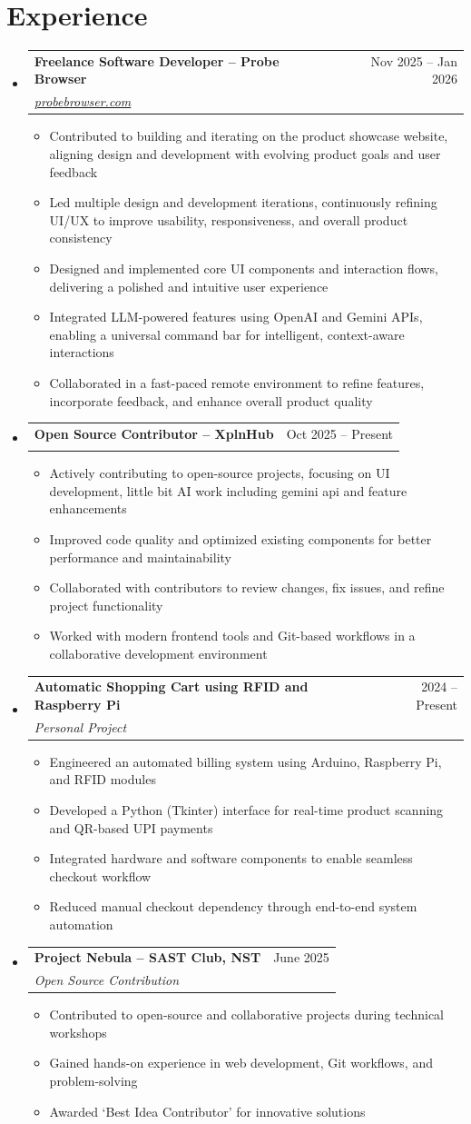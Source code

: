 \documentclass[letterpaper,11pt]{article}
\makeatletter
\newcommand{\resumeItem}[1]{
  \item\small{
    {#1 \vspace{-2pt}}
  }
}
\newcommand{\resumeSubheading}[4]{
  \vspace{-2pt}\item
    \begin{tabular*}{0.97\textwidth}[t]{l@{\extracolsep{\fill}}r}
      \textbf{#1} & #2 \\
      \textit{\small#3} & \textit{\small #4} \\
    \end{tabular*}\vspace{-7pt}
}
\newcommand{\resumeSubHeadingListStart}{\begin{itemize}[leftmargin=0.15in, label={}]}
\newcommand{\resumeSubHeadingListEnd}{\end{itemize}}
\newcommand{\resumeItemListStart}{\begin{itemize}}
\newcommand{\resumeItemListEnd}{\end{itemize}\vspace{-5pt}}
\makeatother
\begin{document}
\section{Experience}
  \resumeSubHeadingListStart
    \resumeSubheading
  {Freelance Software Developer – Probe Browser}{Nov 2025 -- Jan 2026}
  {\href{https://probebrowser.com}{probebrowser.com}}{}
  \resumeItemListStart
    \resumeItem{Contributed to building and iterating on the product showcase website, aligning design and development with evolving product goals and user feedback}
    \resumeItem{Led multiple design and development iterations, continuously refining UI/UX to improve usability, responsiveness, and overall product consistency}
    \resumeItem{Designed and implemented core UI components and interaction flows, delivering a polished and intuitive user experience}
    \resumeItem{Integrated LLM-powered features using OpenAI and Gemini APIs, enabling a universal command bar for intelligent, context-aware interactions}
    \resumeItem{Collaborated in a fast-paced remote environment to refine features, incorporate feedback, and enhance overall product quality}
  \resumeItemListEnd
  \resumeSubheading
  {Open Source Contributor – XplnHub}{Oct 2025 -- Present}
  {}{}
  \resumeItemListStart
    \resumeItem{Actively contributing to open-source projects, focusing on UI development, little bit AI work including gemini api and feature enhancements}
    \resumeItem{Improved code quality and optimized existing components for better performance and maintainability}
    \resumeItem{Collaborated with contributors to review changes, fix issues, and refine project functionality}
    \resumeItem{Worked with modern frontend tools and Git-based workflows in a collaborative development environment}
  \resumeItemListEnd
    \resumeSubheading
  {Automatic Shopping Cart using RFID and Raspberry Pi}{2024 -- Present}
  {Personal Project}{}
  \resumeItemListStart
    \resumeItem{Engineered an automated billing system using Arduino, Raspberry Pi, and RFID modules}
    \resumeItem{Developed a Python (Tkinter) interface for real-time product scanning and QR-based UPI payments}
    \resumeItem{Integrated hardware and software components to enable seamless checkout workflow}
    \resumeItem{Reduced manual checkout dependency through end-to-end system automation}
  \resumeItemListEnd
    \resumeSubheading
  {Project Nebula – SAST Club, NST}{June 2025}
  {Open Source Contribution}{}
  \resumeItemListStart
    \resumeItem{Contributed to open-source and collaborative projects during technical workshops}
    \resumeItem{Gained hands-on experience in web development, Git workflows, and problem-solving}
    \resumeItem{Awarded ‘Best Idea Contributor’ for innovative solutions}
  \resumeItemListEnd
  \resumeSubHeadingListEnd
\end{document}
